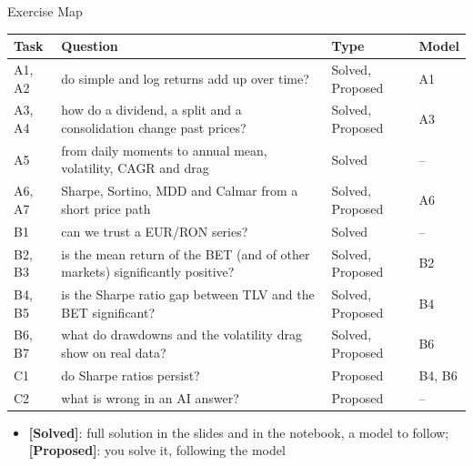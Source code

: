 \begin{frame}{Exercise Map}
\itemsize{\small}
\begin{center}
\footnotesize
\begin{tabular}{>{\raggedright\arraybackslash}p{1.0cm}>{\raggedright\arraybackslash}p{7.6cm}>{\raggedright\arraybackslash}p{1.9cm}>{\raggedright\arraybackslash}p{1.4cm}}
\toprule
\textbf{Task} & \textbf{Question} & \textbf{Type} & \textbf{Model} \\
\midrule
A1, A2 & do simple and log returns add up over time? & Solved, Proposed & A1 \\
A3, A4 & how do a dividend, a split and a consolidation change past prices? & Solved, Proposed & A3 \\
A5 & from daily moments to annual mean, volatility, CAGR and drag & Solved & -- \\
A6, A7 & Sharpe, Sortino, MDD and Calmar from a short price path & Solved, Proposed & A6 \\
B1 & can we trust a EUR/RON series? & Solved & -- \\
B2, B3 & is the mean return of the BET (and of other markets) significantly positive? & Solved, Proposed & B2 \\
B4, B5 & is the Sharpe ratio gap between TLV and the BET significant? & Solved, Proposed & B4 \\
B6, B7 & what do drawdowns and the volatility drag show on real data? & Solved, Proposed & B6 \\
C1 & do Sharpe ratios persist? & Proposed & B4, B6 \\
C2 & what is wrong in an AI answer? & Proposed & -- \\
\bottomrule
\end{tabular}
\end{center}
\begin{itemize}
    \item \textbf{[Solved]}: full solution in the slides and in the notebook, a model to follow; \textbf{[Proposed]}: you solve it, following the model
\end{itemize}
\end{frame}

